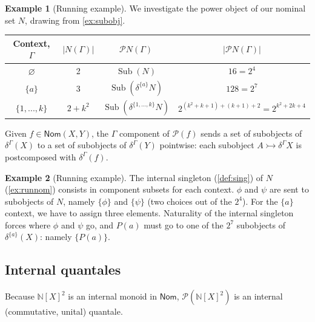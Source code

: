 \documentclass{article}
\theoremstyle{definition}
\newtheorem{example}{Example}[section]
\newcommand{\N}{\mathbb{N}}
\newcommand{\cP}{\mathcal{P}}
\newcommand{\cat}[1]{\mathsf{#1}}
\newcommand{\Nom}{\cat{Nom}}
\newcommand{\Sub}{\operatorname{Sub}}
\begin{document}
\begin{example}[Running example]
    \label{ex:powerobj}
We investigate the power object of our nominal set $N$, drawing from \cref{ex:subobj}.

\begin{center}
\begin{tabular}{||c||c|c|c||}
\hline\hline 
Context, $\Gamma$     & $|N(\Gamma)|$ & $\cP N(\Gamma)$      & $|\cP N(\Gamma)|$   \\
\hline $\varnothing$ & 2 &  $\Sub(N)$ & $16=2^4$ \\
\hline $\{a\}$ & 3  & $\Sub(\delta^{\{a\}} N)$ & $128=2^7$ \\
\hline $\{1,...,k\}$ &  $2+k^2$ & $\Sub(\delta^{\{1,...,k\}} N)$ & $2^{(k^2+k+1)+(k+1)+2}=2^{k^2+2k+4}$ \\
\hline\hline
\end{tabular}
\end{center}


\end{example}


Given $f\in \Nom(X,Y)$, the $\Gamma$ component of $\cP(f)$ sends a set of subobjects of $\delta^\Gamma(X)$ to a set of subobjects of $\delta^\Gamma(Y)$ pointwise: each subobject $A \rightarrowtail \delta^\Gamma X$ is postcomposed with $\delta^\Gamma(f)$. 

\begin{example}[Running example]
The internal singleton (\cref{def:sing}) of $N$ (\cref{ex:runnom}) consists in component subsets for each context. 
$\phi$ and $\psi$ are sent to subobjects of $N$, namely $\{\phi\}$ and $\{\psi\}$ (two choices out of the $2^4$). 
For the $\{a\}$ context, we have to assign three elements. 
Naturality of the internal singleton forces where $\phi$ and $\psi$ go, and $P(a)$ must go to one of the $2^7$ subobjects of $\delta^{\{a\}}(X)$: namely $\{P(a)\}$.
\end{example}


\subsection*{Internal quantales}


Because $\N[X]^2$ is an internal monoid in $\Nom$, $\cP(\N[X]^2)$ is an internal (commutative, unital) quantale. 
\end{document}
